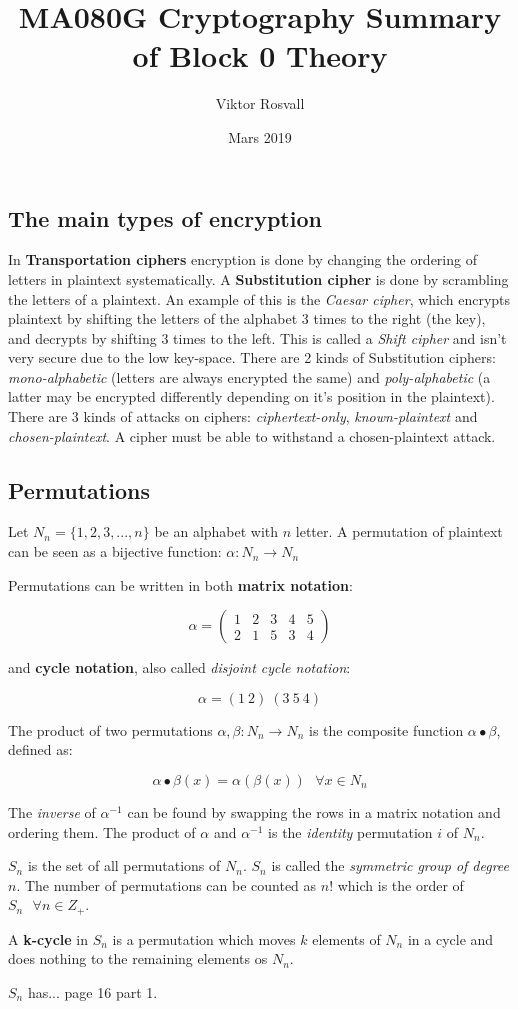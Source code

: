 \documentclass{article}
\title{MA080G Cryptography Summary of Block 0 Theory}
\author{Viktor Rosvall}
\date{Mars 2019}
\begin{document}
	\maketitle
	\subsection*{The main types of encryption}

	In \textbf{Transportation ciphers} encryption is done by changing the ordering of letters in plaintext systematically. A \textbf{Substitution cipher} is done by scrambling the letters of a plaintext. An example of this is the \textit{Caesar cipher}, which encrypts plaintext by shifting the letters of the alphabet 3 times to the right (the key), and decrypts by shifting 3 times to the left. This is called a \textit{Shift cipher} and isn't very secure due to the low key-space. There are 2 kinds of Substitution ciphers: \textit{mono-alphabetic} (letters are always encrypted the same) and \textit{poly-alphabetic} (a latter may be encrypted differently depending on it’s position in the plaintext). There are 3 kinds of attacks on ciphers: \textit{ciphertext-only}, \textit{known-plaintext} and \textit{chosen-plaintext}. A cipher must be able to withstand a chosen-plaintext attack. 
	
	\subsection*{Permutations}
	Let $ N_{n} = \{1,2,3,...,n\} $ be an alphabet with $n$ letter.
	A permutation of plaintext can be seen as a bijective function: $ \alpha : N_{n} \to N_{n} $ 
	

	Permutations can be written in both \textbf{matrix notation}:

	$$
	\alpha = 
	\begin{pmatrix}
	1 & 2 & 3 & 4 & 5 \\
	2 & 1 & 5 & 3 & 4
	\end{pmatrix}
	$$
	
	 and \textbf{cycle notation}, also called \textit{disjoint cycle notation}:
	
	$$
	\alpha = (1 \ 2) \ (3 \ 5 \ 4)
	$$
	
	The product of two permutations $\alpha, \beta : N_n \to N_n$ is the composite function $\alpha \bullet \beta$, defined as:
	
	$$
	\alpha \bullet \beta(x) = \alpha(\beta(x)) \ \ \ \forall x \in N_n
	$$
	
	The \textit{inverse} of $\alpha^{-1}$ can be found by swapping the rows in a matrix notation and ordering them. The product of $\alpha$ and $\alpha^{-1}$ is the \textit{identity} permutation $i$ of $N_n$.
	
	$S_n$ is the set of all permutations of $N_n$. $S_n$ is called the \textit{symmetric group of degree $n$}. The number of permutations can be counted as $n!$ which is the order of $S_n \ \ \ \forall n \in Z_+$.
	
	A \textbf{k-cycle} in $S_n$ is a permutation which moves $k$ elements of $N_n$ in a cycle and does nothing to the remaining elements os $N_n$.
	
	$S_n$ has... page 16 part 1. 
\end{document}
